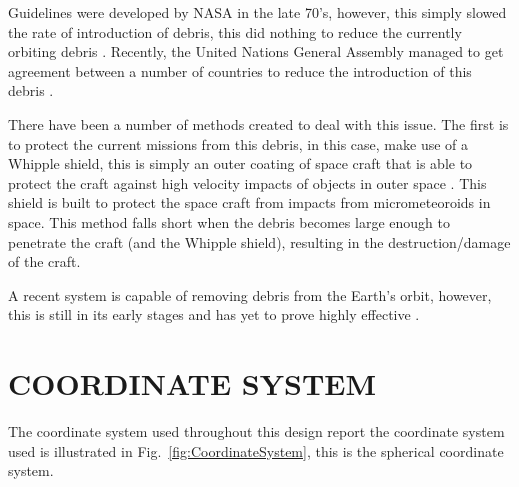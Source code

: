 \documentclass[11pt]{witseiepaper}
\begin{document}
\begin{bibunit}[witseie]
Guidelines were developed by NASA in the late 70's, however, this simply slowed the rate of introduction of debris, this did nothing to reduce the currently orbiting debris \cite{spaceDebrisGuide}. Recently, the United Nations General Assembly managed to get agreement between a number of countries to reduce the introduction of this debris \cite{debrisGuidelinesAgreement}.

There have been a number of methods created to deal with this issue. The first is to protect the current missions from this debris, in this case, make use of a Whipple shield, this is simply an outer coating of space craft that is able to protect the craft against high velocity impacts of objects in outer space \cite{Whipple}. This shield is built to protect the space craft from impacts from micrometeoroids in space.
This method falls short when the debris becomes large enough to penetrate the craft (and the Whipple shield), resulting in the destruction/damage of the craft.

A recent system is capable of removing debris from the Earth's orbit, however, this is still in its early stages and has yet to prove highly effective \cite{removalSpaceDebris}.

\section{COORDINATE SYSTEM} \label{sec:CoordinateSystem}
The coordinate system used throughout this design report the coordinate system used is illustrated in Fig.~\ref{fig:CoordinateSystem}, this is the spherical coordinate system.
\begin{figure}
    \centering



\end{figure}
\end{bibunit}
\end{document}

